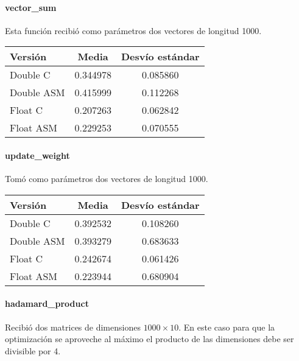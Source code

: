 \paragraph{vector\_sum}

Esta función recibió como parámetros dos vectores de longitud 1000.

\begin{center}
    \begin{tabular}{| l | c | c |}
                \hline
    Versión & Media & Desvío estándar \\
                \hline
    Double C & 0.344978 & 0.085860 \\
    Double ASM & 0.415999 & 0.112268 \\
    Float C & 0.207263 & 0.062842 \\
    Float ASM  & 0.229253 & 0.070555 \\
                \hline
            
        \end{tabular}
\end{center}


\paragraph{update\_weight}

Tomó como parámetros dos vectores de longitud 1000.

\begin{center}
    \begin{tabular}{| l | c | c |}
                \hline
    Versión & Media & Desvío estándar \\
                \hline
    Double C & 0.392532 & 0.108260 \\
    Double ASM & 0.393279 & 0.683633 \\
    Float C & 0.242674 & 0.061426 \\
    Float ASM  & 0.223944 & 0.680904 \\
                \hline
            
        \end{tabular}
\end{center}


\paragraph{hadamard\_product}

Recibió dos matrices de dimensiones $1000\times 10$. En este caso para que la optimización se aproveche al máximo el producto de las dimensiones debe ser divisible por 4.

